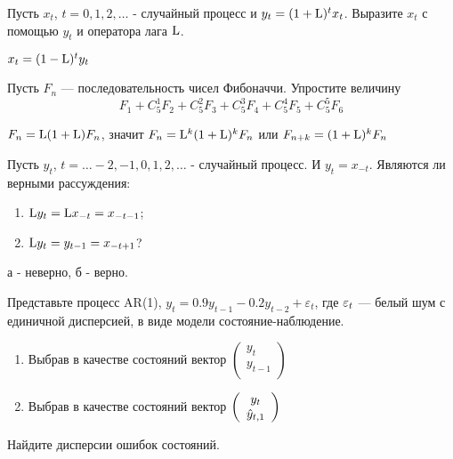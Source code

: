 
\begin{problem}
Пусть $x_{t}$, $t=0,1,2,\ldots$ - случайный процесс и $y_{t}=(1+\mathrm{L} )^{t}x_{t}$.
Выразите $x_{t}$ с помощью $y_{t}$ и оператора лага $\mathrm{L} $.


\begin{sol}
$x_{t}=(1-\mathrm{L} )^{t}y_{t}$
\end{sol}
\end{problem}



\begin{problem}
Пусть $ F_{n} $ — последовательность чисел Фибоначчи. Упростите величину
\[ F_{1}+C^{1}_{5}F_{2}+C^{2}_{5}F_{3}+C^{3}_{5}F_{4}+C^{4}_{5}F_{5}+C^{5}_{5}F_{6} \]


\begin{sol}
$ F_{n}=\mathrm{L} (1+\mathrm{L} )F_{n} $, значит $ F_{n}=\mathrm{L} ^{k}(1+\mathrm{L} )^{k}F_{n} $ или $ F_{n+k}=(1+\mathrm{L} )^{k}F_{n} $
\end{sol}
\end{problem}




\begin{problem}
Пусть $y_{t}$, $t=\ldots -2, -1, 0, 1, 2, \ldots$ - случайный процесс. И $y_{t}=x_{-t}$. Являются ли верными рассуждения:
\begin{enumerate}
\item $\mathrm{L} y_{t}=\mathrm{L} x_{-t}=x_{-t-1}$;
\item $\mathrm{L} y_{t}=y_{t-1}=x_{-t+1}$?
\end{enumerate}


\begin{sol}
а - неверно, б - верно.
\end{sol}
\end{problem}






\begin{problem}
Представьте процесс AR(1),
$y_{t}=0.9y_{t-1}-0.2y_{t-2}+\varepsilon_{t}$, где $\varepsilon_t$ —  белый шум с единичной дисперсией,
в виде модели состояние-наблюдение.
\begin{enumerate}
\item  Выбрав в качестве состояний вектор $\left(%
\begin{array}{c}
  y_{t} \\
  y_{t-1} \\
\end{array}%
\right)$ \\
\item Выбрав в качестве состояний вектор $\left(%
\begin{array}{c}
  y_{t} \\
  \hy_{t,1} \\
\end{array}%
\right)$
\end{enumerate}
Найдите дисперсии ошибок состояний.


\begin{sol}
\end{sol}
\end{problem}


